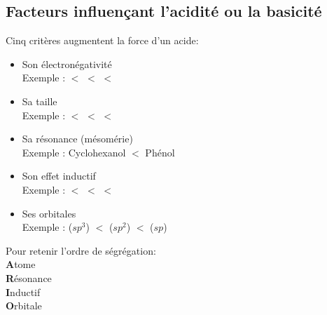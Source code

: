 \documentclass{article}
\begin{document}
    \subsection{Facteurs influençant l'acidité ou la basicité}
        Cinq critères augmentent la force d'un acide:
        \begin{itemize}
            \item Son électronégativité\\
            Exemple :  $<$  $<$  $<$ 
            \item Sa taille\\
            Exemple :  $<$  $<$  $<$ 
            \item Sa résonance (mésomérie)\\
            Exemple : Cyclohexanol $<$ Phénol
            \item Son effet inductif\\
            Exemple :  $<$  $<$  $<$ 
            \item Ses orbitales\\
            Exemple :  ($sp^3$) $<$  ($sp^2$) $<$  ($sp$)
        \end{itemize}
        Pour retenir l'ordre de ségrégation:\\
        \textbf{A}tome\\
        \textbf{R}ésonance\\
        \textbf{I}nductif\\
        \textbf{O}rbitale\\
\end{document}
